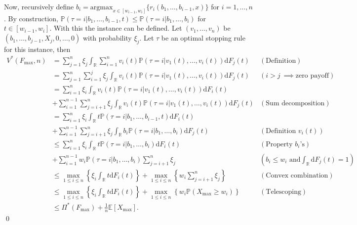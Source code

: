 \documentclass[11pt,a4paper]{article}
\numberwithin{equation}{section}
\begin{document}
Now, recursively define $b_i=\mathrm{argmax}_{x\in[w_{i-1}, w_i]}\{r_i(b_1,\dots,b_{i-1}, x)\}$ for $i=1,\dots,n$. By construction, $\mathbb{P}(\tau=i|b_1,\dots,b_{i-1},t)\le \mathbb{P}(\tau=i|b_1,\dots,b_i)$ for $t\in[w_{i-1}, w_i]$. With this the instance can be defined. Let $(v_1,\dots,v_n)$ be $(b_1,\dots,b_{j-1},X_j,0,\dots,0)$ with probability $\xi_j$. Let $\tau$ be an optimal stopping rule for this instance, then 
    \begin{align*}
        V^*(F_{\max}, n)&=\sum_{j=1}^n\xi_j\int_{\mathbb{R}}\sum_{i=1}^nv_i(t)\mathbb{P}(\tau=i | v_1(t),\dots,v_i(t))\mathrm{d}F_{j}(t) &(\text{Definition})\\
        &=\sum_{j=1}^n\sum_{i=1}^j\xi_j\int_{\mathbb{R}}v_i(t)\mathbb{P}(\tau=i | v_1(t),\dots,v_i(t))\mathrm{d}F_{j}(t)&(i>j \ \implies \text{zero payoff})\\
        &=\sum_{i=1}^n\xi_i\int_{\mathbb{R}}v_i(t)\mathbb{P}(\tau=i | v_1(t),\dots,v_i(t))\mathrm{d}F_{i}(t)\\
        &+\sum_{i=1}^{n-1}\sum_{j=i+1}^n\xi_j\int_{\mathbb{R}}v_i(t)\mathbb{P}(\tau=i | v_1(t),\dots,v_i(t))\mathrm{d}F_{j}(t)&(\text{Sum decomposition})\\
        &=\sum_{i=1}^n\xi_i\int_{\mathbb{R}}t\mathbb{P}(\tau=i | b_1,\dots,b_{i-1},t)\mathrm{d}F_{i}(t)\\
        &+\sum_{i=1}^{n-1}\sum_{j=i+1}^n\xi_j\int_{\mathbb{R}}b_i\mathbb{P}(\tau=i | b_1,\dots,b_i)\mathrm{d}F_{j}(t)&(\text{Definition }v_i(t))\\
        &\le\sum_{i=1}^n\xi_i\int_{\mathbb{R}}t\mathbb{P}(\tau=i | b_1,\dots,b_i)\mathrm{d}F_{i}(t)&(\text{Property }b_i\text{'s})\\
        &+\sum_{i=1}^{n-1}w_i\mathbb{P}(\tau=i | b_1,\dots,b_i)\sum_{j=i+1}^n\xi_j&(b_i\le w_i \text{ and} \int_{\mathbb{R}}\mathrm{d}F_{j}(t)=1)\\
        &\le \max_{1\le i \le n}\left\{\xi_i \int_{\mathbb{R}}t\mathrm{d}F_i(t)\right\}+\max_{1 \le i \le n}\left\{w_i\sum_{j=i+1}^n\xi_j\right\}&(\text{Convex combination})\\
        &\le \max_{1\le i \le n}\left\{\xi_i \int_{\mathbb{R}}t\mathrm{d}F_i(t)\right\}+\max_{1 \le i \le n}\left\{w_i \mathbb{P}(X_{\max}\ge w_i)\right\}&(\text{Telescoping})\\
        &\le \Pi^*(F_{\max}) + \frac{1}{n}\mathbb{E}[X_{\max}].
    \end{align*} \qed
\newpage
\end{document}
